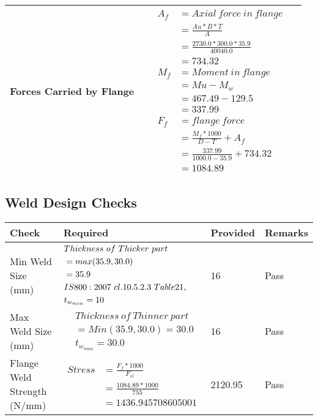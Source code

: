\documentclass{article}%
\begin{document}
\begin{longtable}{|p{4cm}|p{5cm}|p{5.5cm}|p{1.5cm}|}
\hline%
Forces Carried by Flange&&$\begin{aligned} A_f&= Axial~force~ in ~flange  \\ &= \frac{Au * B *T}{A} \\ &= \frac{2730.0 * 300.0*35.9}{40040.0} \\ &=734.32\\ M_f& =Moment~ in~ flange \\  & = Mu-M_w\\ &= 467.49-129.5\\ &=337.99\\  F_f& =flange~force  \\ & = \frac{M_f *1000}{D-T} + A_f \\ &= \frac{337.99}{1000.0-35.9} +734.32 \\ &=1084.89\end{aligned}$&\\%
\hline%
\end{longtable}

%
\newpage%
\subsection{Weld Design Checks}%
\label{subsec:WeldDesignChecks}%
\renewcommand{\arraystretch}{1.2}%
\begin{longtable}{|p{4cm}|p{5cm}|p{5.5cm}|p{1.5cm}|}%
\hline%
\rowcolor{OsdagGreen}%
Check&Required&Provided&Remarks\\%
\hline%
\endhead%
\hline%
Min Weld Size (mm)&$\begin{aligned} &Thickness~of~Thicker~part\\ \noindent &=max(35.9,30.0)\\ &=35.9\\ &IS800:2007~cl.10.5.2.3~Table 21,\\  &t_{w_{min}}=10\end{aligned}$&16&Pass\\%
\hline%
Max Weld Size (mm)&$\begin{aligned} & Thickness~of~Thinner~part\\ &=Min(35.9,30.0)=30.0\\ &t_{w_{max}} =30.0\end{aligned}$&16&Pass\\%
\hline%
Flange Weld Strength (N/mm)&$\begin{aligned} Stress &= \frac{F_f*1000}{F_{rl}}\\  &= \frac{1084.89*1000}{755}\\ &= 1436.945708605001\end{aligned}$&2120.95&Pass\\%
\hline%
\end{longtable}
\end{document}
